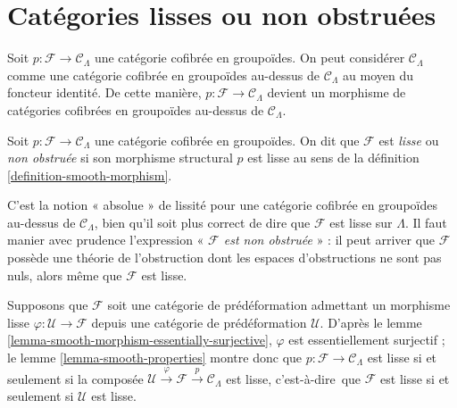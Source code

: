 \section{Catégories lisses ou non obstruées}
\label{section-smooth}

\noindent
Soit $p : \mathcal{F} \to \mathcal{C}_\Lambda$ une catégorie cofibrée en
groupoïdes. On peut considérer $\mathcal{C}_\Lambda$ comme une catégorie
cofibrée en groupoïdes au-dessus de $\mathcal{C}_\Lambda$ au moyen du foncteur
identité. De cette manière,
$p : \mathcal{F} \longrightarrow \mathcal{C}_\Lambda$
devient un morphisme de catégories cofibrées en groupoïdes au-dessus de
$\mathcal{C}_\Lambda$.

\begin{definition}
\label{definition-cofibered-groupoid-projection-smooth}
Soit $p : \mathcal{F} \to \mathcal{C}_\Lambda$ une catégorie cofibrée en
groupoïdes. On dit que $\mathcal{F}$ est {\it lisse} ou {\it non obstruée} si
son morphisme structural $p$ est lisse au sens de la définition
\ref{definition-smooth-morphism}.
\end{definition}

\noindent
C'est la notion « absolue » de lissité pour une catégorie cofibrée en
groupoïdes au-dessus de $\mathcal{C}_\Lambda$, bien qu'il soit plus correct de
dire que $\mathcal{F}$ est lisse sur $\Lambda$. Il faut manier avec prudence
l'expression « {\it $\mathcal{F}$ est non obstruée} » : il peut arriver que
$\mathcal{F}$ possède une théorie de l'obstruction dont les espaces
d'obstructions ne sont pas nuls, alors même que $\mathcal{F}$ est lisse.

\begin{remark}
\label{remark-smooth-on-top}
Supposons que $\mathcal{F}$ soit une catégorie de prédéformation admettant un
morphisme lisse $\varphi : \mathcal U \to \mathcal{F}$ depuis une catégorie
de prédéformation $\mathcal{U}$. D'après le lemme
\ref{lemma-smooth-morphism-essentially-surjective}, $\varphi$ est
essentiellement surjectif ; le lemme \ref{lemma-smooth-properties} montre donc
que $p: \mathcal{F} \to \mathcal{C}_\Lambda$ est lisse si et seulement si la
composée $\mathcal U \xrightarrow{\varphi} \mathcal{F} \xrightarrow{p}
\mathcal{C}_\Lambda$ est lisse, c'est-à-dire\ que $\mathcal{F}$ est lisse si
et seulement si $\mathcal{U}$ est lisse.
\end{remark}

